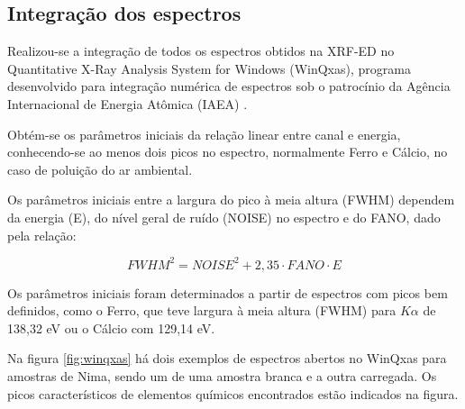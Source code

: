 \subsection{Integração dos espectros}

Realizou-se a integração de todos os espectros obtidos na XRF-ED no
Quantitative X-Ray Analysis System for Windows (WinQxas),
programa desenvolvido para integração numérica de espectros sob o patrocínio 
da Agência Internacional de Energia Atômica (IAEA) \citep{capote2000}.

Obtém-se os parâmetros iniciais da relação linear entre canal e energia,
conhecendo-se ao menos dois picos no espectro, normalmente Ferro e Cálcio, 
no caso de poluição do ar ambiental. 

Os parâmetros iniciais entre a largura do pico à meia altura (FWHM)
dependem da energia (E), do nível geral de ruído (NOISE) no espectro 
e do FANO, dado pela relação: 

\begin{equation}
  \label{eq:fwhm}
   {FWHM}^2 = {NOISE}^2 + 2,35 \cdot FANO  \cdot E
\end{equation}

Os parâmetros iniciais foram determinados a partir de espectros com picos 
bem definidos, como o Ferro, que teve largura à meia altura (FWHM) para 
$K\alpha$ de 138,32 eV ou o Cálcio com 129,14 eV.

Na figura \ref{fig:winqxas} há dois exemplos de espectros abertos no WinQxas
para amostras de Nima, sendo um de uma amostra branca e a outra carregada. Os picos 
característicos de elementos químicos encontrados estão indicados na figura.

